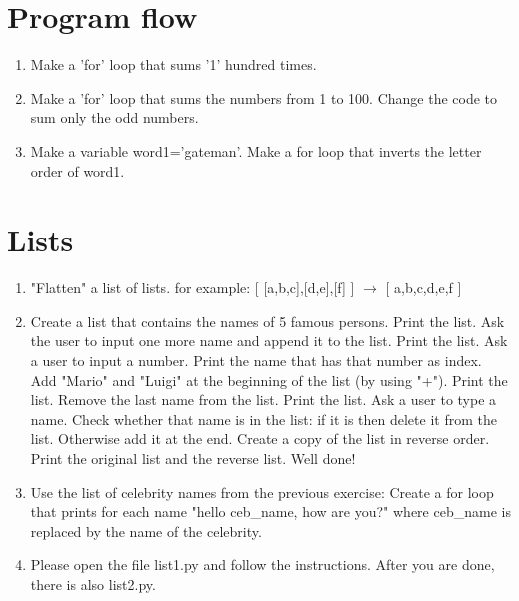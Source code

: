 \documentclass[smallheadings,12pt]{scrartcl}
\begin{document}
\section{Program flow}
\begin{enumerate}
\item Make a 'for' loop that sums '1' hundred times.
\item Make a 'for' loop that sums the numbers from 1 to 100. Change the code to sum only the odd numbers.
\item Make a variable word1='gateman'. Make a for loop that inverts the letter order of word1.
%
\end{enumerate}


\section{Lists}

\begin{enumerate}
\item "Flatten" a list of lists.
for example: [ [a,b,c],[d,e],[f] ] $\rightarrow$ [ a,b,c,d,e,f ]
\item Create a list that contains the names of 5 famous persons. Print the list. Ask the user to input one more name and append it to the list. Print the list. Ask a user to input a number. Print the name that has that number as index. Add "Mario" and "Luigi" at the beginning of the list (by using "+"). Print the list. Remove the last name from the list. Print the list. Ask a user to type a name. Check whether that name is in the list: if it is then delete it from the list. Otherwise add it at the end. Create a copy of the list in reverse order. Print the original list and the reverse list. Well done!
\item Use the list of celebrity names from the previous exercise: Create a for loop that prints for each name "hello ceb\_name, how are you?" where ceb\_name is replaced by the name of the celebrity.
\item Please open the file list1.py and follow the instructions.
After you are done, there is also list2.py.
\end{enumerate}
\end{document}
